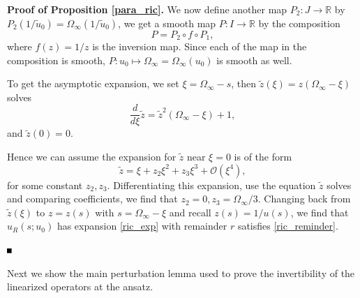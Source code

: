 \documentclass[letterpaper,11pt]{article}
\newcommand{\rmO}{\mathcal{O}}
\numberwithin{equation}{section}
\theoremstyle{plain}
\newenvironment{Proof}[1][\unskip]%
 {\begin{trivlist} \item[]{\bf Proof #1. }}%
 {\hspace*{\fill}$\rule{.4\baselineskip}{.4\baselineskip}$\end{trivlist}}
\begin{document}
\begin{Proof}[\textbf{ of Proposition \ref{para_ric}}]
 We now define another map $P_2 : J \to \mathbb{R}$ by $P_2(1/\tilde{u}_0) = \Omega_\infty(1/\tilde{u}_0)$, we get a smooth map $P: I \to \mathbb{R}$ by the composition
 \[
 P =P_2 \circ f \circ P_1,
 \] 
 where $f(z) = 1/z$ is the inversion map. Since each of the map in the composition is smooth, $P: u_0 \mapsto \Omega_\infty = \Omega_\infty(u_0)$ is smooth as well.

To get the asymptotic expansion, we set $\xi = \Omega_\infty-s$, then $\tilde{z}(\xi)=z(\Omega_\infty-\xi)$ solves
\[
\frac{d}{d\xi} \tilde{z} = \tilde{z}^2(\Omega_\infty-\xi)+1,
\]
and $\tilde{z}(0) = 0$.

Hence we can assume the expansion for $\tilde{z}$ near $\xi=0$ is of the form
\[
\tilde{z} = \xi + z_2\xi^2+z_3\xi^3 + \rmO(\xi^4),
\]
for some constant $z_2,z_3$. Differentiating this expansion, use the equation $\tilde{z}$ solves and comparing coefficients, we find that $z_2 = 0, z_3 = \Omega_\infty/3$.  Changing back from $\tilde{z}(\xi)$ to $z=z(s)$ with $s = \Omega_\infty-\xi$ and recall $z(s) = 1/u(s)$, we find that $u_R(s;u_0)$ has expansion \eqref{ric_exp} with remainder $r$ satisfies \eqref{ric_reminder}.


\end{Proof}

Next we show the main perturbation lemma used to prove the invertibility of the linearized operators at the ansatz.
\end{document}
